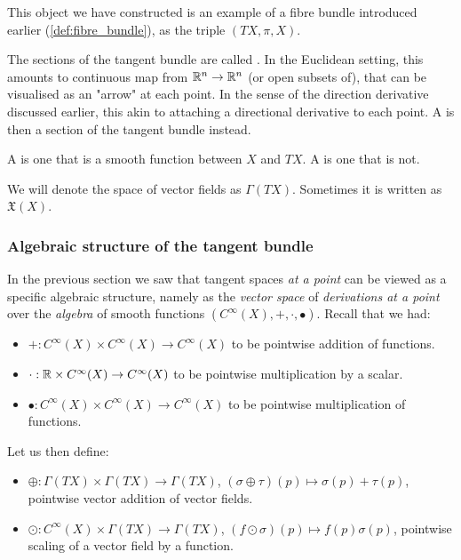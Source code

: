 This object we have constructed is an example of a fibre bundle introduced earlier (\cref{def:fibre_bundle}), as the triple \((TX, \pi, X)\).

The sections of the tangent bundle are called .
In the Euclidean setting, this amounts to continuous map from \(\mathbb{R}^n \to \mathbb{R}^n\) (or open subsets of), that can be visualised as an "arrow" at each point.
In the sense of the direction derivative discussed earlier, this akin to attaching a directional derivative to each point.
A  is then a section of the tangent bundle instead.

A  is one that is a smooth function between \(X\) and \(TX\).
A  is one that is not.

We will denote the space of vector fields as \(\Gamma(TX)\).
Sometimes it is written as \(\mathfrak{X}(X)\).

\subsubsection{Algebraic structure of the tangent bundle}
\label{sec:tangent_bundle_structure}
In the previous section we saw that tangent spaces \emph{at a point} can be viewed as a specific algebraic structure, namely as the \emph{vector space} of \emph{derivations at a point} over the \emph{algebra} of smooth functions \((C^\infty(X), +, \cdot, \bullet)\). 
Recall that we had:
\begin{itemize}
	\item \(+: C^\infty(X)\times C^\infty(X) \to C^\infty(X)\) to be pointwise addition of functions.
	\item \(\cdot: \mathbb{R} \times C^\infty(X) \to C^\infty(X) \) to be pointwise multiplication by a scalar.
	\item \(\bullet:C^\infty(X)\times C^\infty(X) \to C^\infty(X) \) to be pointwise multiplication of functions.
\end{itemize}
Let us then define:
\begin{itemize}
	\item \(\oplus: \Gamma(TX)\times \Gamma(TX)\to \Gamma(TX)\), \((\sigma\oplus \tau)(p) \mapsto \sigma(p) + \tau(p)\), pointwise vector addition of vector fields.
	\item \(\odot: C^\infty(X) \times \Gamma(TX) \to \Gamma(TX)\), \((f\odot \sigma)(p) \mapsto f(p)\sigma(p)\), pointwise scaling of a vector field by a function.
\end{itemize}

